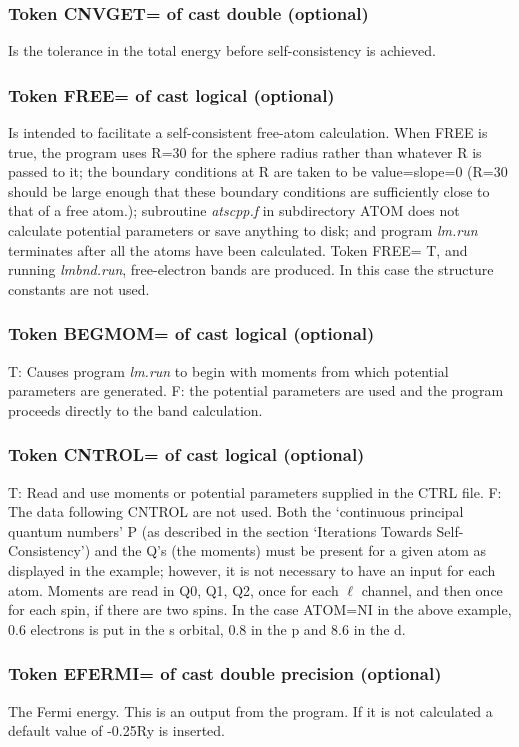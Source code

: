 \documentclass[aps,twocolumn,a4]{revtex4}
\begin{document}
\subsubsection{Token CNVGET= of cast double (optional)}
Is the tolerance in the total energy before self-consistency
is achieved.

\subsubsection{Token FREE= of cast logical (optional)}
Is intended to facilitate a self-consistent free-atom
calculation.  When FREE is true, the program uses R=30 for the sphere
radius rather than whatever R is passed to it; the boundary
conditions at R are taken to be value=slope=0 (R=30 should be
large enough that these boundary conditions are sufficiently close to
that of a free atom.); subroutine {\em atscpp.f} in subdirectory ATOM
does not calculate potential
parameters or save anything to disk; and program
{\em lm.run} terminates after all
the atoms have been calculated.  Token FREE= T, and running {\em
lmbnd.run}, free-electron bands are produced.  In this case the
structure constants are not used.

\subsubsection{Token BEGMOM= of cast logical (optional)}
T: Causes program {\em lm.run} to begin with moments from
which potential parameters are generated. F: the potential
parameters are used and the program proceeds directly to the band
calculation.

\subsubsection{Token CNTROL= of cast logical (optional)}
T: Read and use moments or potential parameters
supplied in the CTRL file.
F: The data following CNTROL are not used.  Both the
`continuous principal quantum numbers' P (as described in the section
`Iterations Towards Self-Consistency') and the Q's (the moments) must be
present for a given atom as displayed in the example; however, it is not
necessary to have an input for each atom.  Moments are read in Q0, Q1,
Q2, once for each $\ell $ channel,
and then once for each spin, if there are
two spins.  In the case ATOM=NI in the above example, 0.6 electrons
is put in the s orbital, 0.8 in the p and 8.6 in the d.

\subsubsection{Token EFERMI= of cast double precision (optional)}
The Fermi energy. This is an output from the program. If it is not
calculated a default value of -0.25Ry is inserted.
\end{document}
